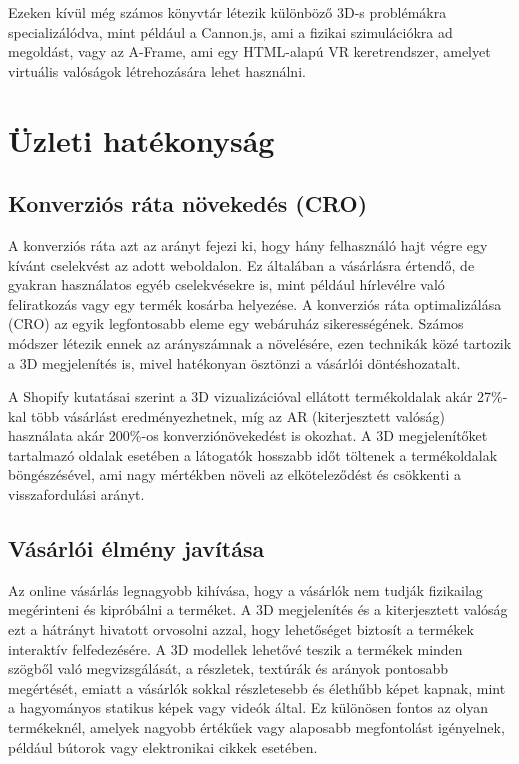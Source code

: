 \documentclass[12pt]{report}
\begin{document}
        Ezeken kívül még számos könyvtár létezik különböző 3D-s problémákra specializálódva, mint például a Cannon.js, ami a fizikai szimulációkra ad megoldást, vagy az A-Frame, ami egy HTML-alapú VR keretrendszer, amelyet virtuális valóságok létrehozására lehet használni.
        
        \section{Üzleti hatékonyság}
        \subsection{Konverziós ráta növekedés (CRO)}

        A konverziós ráta azt az arányt fejezi ki, hogy hány felhasználó hajt végre egy kívánt cselekvést az adott weboldalon. Ez általában a vásárlásra értendő, de gyakran használatos egyéb cselekvésekre is, mint például hírlevélre való feliratkozás vagy egy termék kosárba helyezése. A konverziós ráta optimalizálása (CRO) az egyik legfontosabb eleme egy webáruház sikerességének. Számos módszer létezik ennek az arányszámnak a növelésére, ezen technikák közé tartozik a 3D megjelenítés is, mivel hatékonyan ösztönzi a vásárlói döntéshozatalt. 

        A Shopify kutatásai szerint a 3D vizualizációval ellátott termékoldalak akár 27\%-kal több vásárlást eredményezhetnek, míg az AR (kiterjesztett valóság) használata akár 200\%-os konverziónövekedést is okozhat. A 3D megjelenítőket tartalmazó oldalak esetében a látogatók hosszabb időt töltenek a termékoldalak böngészésével, ami nagy mértékben növeli az elköteleződést és csökkenti a visszafordulási arányt. 
        
        \subsection{Vásárlói élmény javítása}

        Az online vásárlás legnagyobb kihívása, hogy a vásárlók nem tudják fizikailag megérinteni és kipróbálni a terméket. A 3D megjelenítés és a kiterjesztett valóság ezt a hátrányt hivatott orvosolni azzal, hogy lehetőséget biztosít a termékek interaktív felfedezésére. A 3D modellek lehetővé teszik a termékek minden szögből való megvizsgálását, a részletek, textúrák és arányok pontosabb megértését, emiatt a vásárlók sokkal részletesebb és élethűbb képet kapnak, mint a hagyományos statikus képek vagy videók által. Ez különösen fontos az olyan termékeknél, amelyek nagyobb értékűek vagy alaposabb megfontolást igényelnek, például bútorok vagy elektronikai cikkek esetében.
\end{document}
